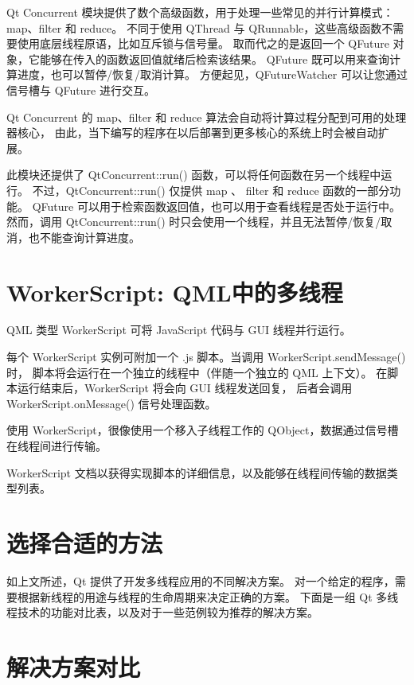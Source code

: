 Qt Concurrent 模块提供了数个高级函数，用于处理一些常见的并行计算模式：map、filter 和 reduce。
不同于使用 QThread 与 QRunnable，这些高级函数不需要使用底层线程原语，比如互斥锁与信号量。
取而代之的是返回一个 QFuture 对象，它能够在传入的函数返回值就绪后检索该结果。
QFuture 既可以用来查询计算进度，也可以暂停/恢复/取消计算。
方便起见，QFutureWatcher 可以让您通过信号槽与 QFuture 进行交互。

Qt Concurrent 的 map、filter 和 reduce 算法会自动将计算过程分配到可用的处理器核心，
由此，当下编写的程序在以后部署到更多核心的系统上时会被自动扩展。

此模块还提供了 QtConcurrent::run() 函数，可以将任何函数在另一个线程中运行。
不过，QtConcurrent::run() 仅提供 map 、 filter 和 reduce 函数的一部分功能。
QFuture 可以用于检索函数返回值，也可以用于查看线程是否处于运行中。
然而，调用 QtConcurrent::run() 时只会使用一个线程，并且无法暂停/恢复/取消，也不能查询计算进度。



\section{WorkerScript: QML中的多线程}

QML 类型 WorkerScript 可将 JavaScript 代码与 GUI 线程并行运行。

每个 WorkerScript 实例可附加一个 .js 脚本。当调用 WorkerScript.sendMessage() 时，
脚本将会运行在一个独立的线程中（伴随一个独立的 QML 上下文）。
在脚本运行结束后，WorkerScript 将会向 GUI 线程发送回复，
后者会调用 WorkerScript.onMessage() 信号处理函数。

使用 WorkerScript，很像使用一个移入子线程工作的 QObject，数据通过信号槽在线程间进行传输。

\begin{seeAlso}
WorkerScript 文档以获得实现脚本的详细信息，以及能够在线程间传输的数据类型列表。
\end{seeAlso}

\section{选择合适的方法}

如上文所述，Qt 提供了开发多线程应用的不同解决方案。
对一个给定的程序，需要根据新线程的用途与线程的生命周期来决定正确的方案。
下面是一组 Qt 多线程技术的功能对比表，以及对于一些范例较为推荐的解决方案。


\section{解决方案对比}

